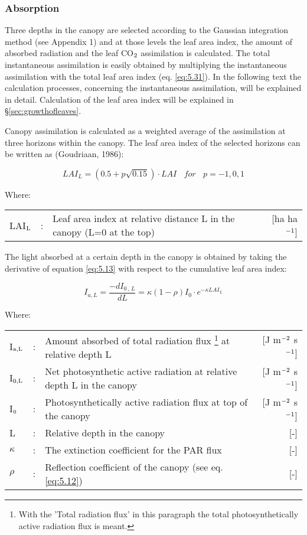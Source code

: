 \subsubsection{Absorption}
Three depths in the canopy are selected according to the Gaussian integration method (see
Appendix 1) and at those levels the leaf area index, the amount of absorbed radiation and
the leaf CO$_{{\rm 2}}$ assimilation is calculated. The total instantaneous assimilation is easily
obtained by multiplying the instantaneous assimilation with the total leaf area index (eq.
\ref{eq:5.31}). In the following text the calculation processes, concerning the instantaneous
assimilation, will be explained in detail. Calculation of the leaf area index will be
explained in \S \ref{sec:growthofleaves}.

Canopy assimilation is calculated as a weighted average of the assimilation at three
horizons within the canopy. The leaf area index of the selected horizons can be written as
(Goudriaan, 1986):

\begin{equation}
LAI_{L} = (0.5 + p \sqrt{0.15}) \cdot LAI~~~~for~~~~p = -1,0,1
\end{equation}


Where:\\[5pt]
\begin{tabularx}{\textwidth}{llXr}
	LAI$_{{\rm L}}$ &:& Leaf area index at relative distance L in the canopy 
	(L=0 at the top)    &    [ha ha$^{{\rm -1}}$]\\
\end{tabularx}

The light absorbed at a certain depth in the canopy is obtained by taking the derivative of
equation \ref{eq:5.13} with respect to the cumulative leaf area index:

\begin{equation}
I_{a,L} = {\frac{-dI _{0\, ,\, L} }{dL}} = \kappa (1 -  \rho) I_{0} \cdot e^{- \kappa LAI_{L}}
\end{equation}

Where:\\[5pt]
\begin{tabularx}{\textwidth}{llXr}
	I$_{{\rm a,L}}$ &:& Amount absorbed of total radiation flux
	\footnote{With the 'Total radiation flux' in this paragraph the total photosynthetically 
		active radiation flux is meant.} at relative depth L    &    
	[J m$^{{\rm -2}}$ s$^{{\rm -1}}$]\\
	I$_{{\rm 0,L}}$ &:& Net photosynthetic active radiation at relative depth L in 
	the canopy    &    [J m$^{{\rm -2}}$ s$^{{\rm -1}}$]\\
	I$_{{\rm 0}}$ &:& Photosynthetically active radiation flux at top of the 
	canopy   &     [J m$^{{\rm -2}}$ s$^{{\rm -1}}$]\\
	L &:& Relative depth in the canopy   &     [-]\\
	$\kappa$ &:& The extinction coefficient for the PAR flux    &     [-]\\
	$\rho$ &:& Reflection coefficient of the canopy (see eq. \ref{eq:5.12})   &     [-]\\
\end{tabularx}

